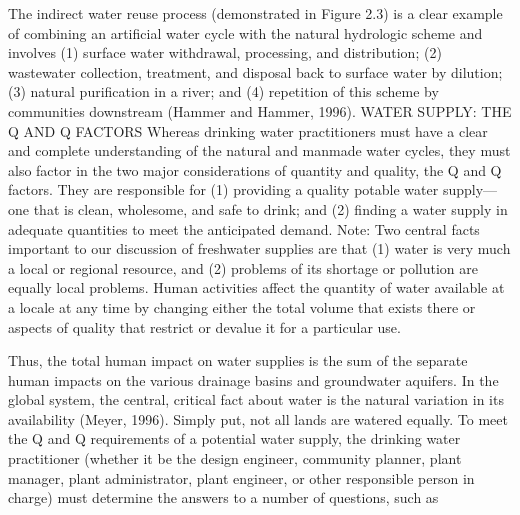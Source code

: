\documentclass{article}
\begin{document}
The indirect water reuse process (demonstrated in Figure 2.3) is a clear
example of combining an artificial water cycle with the natural
hydrologic scheme and involves (1) surface water withdrawal, processing,
and distribution; (2) wastewater collection, treatment, and disposal
back to surface water by dilution; (3) natural purification in a river;
and (4) repetition of this scheme by communities downstream (Hammer and
Hammer, 1996). WATER SUPPLY: THE Q AND Q FACTORS Whereas drinking water
practitioners must have a clear and complete understanding of the
natural and manmade water cycles, they must also factor in the two major
considerations of quantity and quality, the Q and Q factors. They are
responsible for (1) providing a quality potable water supply---one that
is clean, wholesome, and safe to drink; and (2) finding a water supply
in adequate quantities to meet the anticipated demand. Note: Two central
facts important to our discussion of freshwater supplies are that (1)
water is very much a local or regional resource, and (2) problems of its
shortage or pollution are equally local problems. Human activities
affect the quantity of water available at a locale at any time by
changing either the total volume that exists there or aspects of quality
that restrict or devalue it for a particular use.

Thus, the total human impact on water supplies is the sum of the
separate human impacts on the various drainage basins and groundwater
aquifers. In the global system, the central, critical fact about water
is the natural variation in its availability (Meyer, 1996). Simply put,
not all lands are watered equally. To meet the Q and Q requirements of a
potential water supply, the drinking water practitioner (whether it be
the design engineer, community planner, plant manager, plant
administrator, plant engineer, or other responsible person in charge)
must determine the answers to a number of questions, such as
\end{document}
